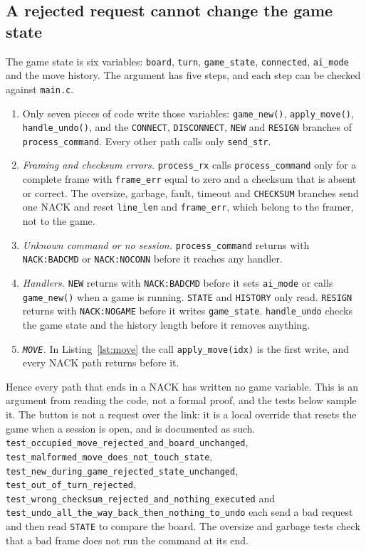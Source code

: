 \subsection{A rejected request cannot change the game state}
The game state is six variables: \texttt{board}, \texttt{turn},
\texttt{game\_state}, \texttt{connected}, \texttt{ai\_mode} and the move history.
The argument has five steps, and each step can be checked against \texttt{main.c}.
\begin{enumerate}\setlength\itemsep{0pt}
\item Only seven pieces of code write those variables: \texttt{game\_new()},
  \texttt{apply\_move()}, \texttt{handle\_undo()}, and the \texttt{CONNECT},
  \texttt{DISCONNECT}, \texttt{NEW} and \texttt{RESIGN} branches of
  \texttt{process\_command}. Every other path calls only \texttt{send\_str}.
\item \emph{Framing and checksum errors.} \texttt{process\_rx} calls
  \texttt{process\_command} only for a complete frame with \texttt{frame\_err}
  equal to zero and a checksum that is absent or correct. The oversize, garbage,
  fault, timeout and \texttt{CHECKSUM} branches send one NACK and reset
  \texttt{line\_len} and \texttt{frame\_err}, which belong to the framer, not to
  the game.
\item \emph{Unknown command or no session.} \texttt{process\_command} returns
  with \texttt{NACK:BADCMD} or \texttt{NACK:NOCONN} before it reaches any
  handler.
\item \emph{Handlers.} \texttt{NEW} returns with \texttt{NACK:BADCMD} before it
  sets \texttt{ai\_mode} or calls \texttt{game\_new()} when a game is running.
  \texttt{STATE} and \texttt{HISTORY} only read. \texttt{RESIGN} returns with
  \texttt{NACK:NOGAME} before it writes \texttt{game\_state}. \texttt{handle\_undo}
  checks the game state and the history length before it removes anything.
\item \emph{\texttt{MOVE}.} In Listing~\ref{lst:move} the call
  \texttt{apply\_move(idx)} is the first write, and every NACK path returns
  before it.
\end{enumerate}
Hence every path that ends in a NACK has written no game variable. This is an
argument from reading the code, not a formal proof, and the tests below sample
it. The button is not a request over the link: it is a local override that
resets the game when a session is open, and is documented as such.
\texttt{test\_occupied\_move\_rejected\_and\_board\_unchanged},
\texttt{test\_malformed\_move\_does\_not\_touch\_state},
\texttt{test\_new\_during\_game\_rejected\_state\_unchanged},
\texttt{test\_out\_of\_turn\_rejected},
\texttt{test\_wrong\_checksum\_rejected\_and\_nothing\_executed} and
\texttt{test\_undo\_all\_the\_way\_back\_then\_nothing\_to\_undo} each send a bad
request and then read \texttt{STATE} to compare the board. The oversize and
garbage tests check that a bad frame does not run the command at its end.

